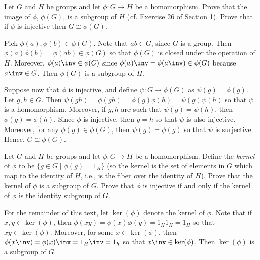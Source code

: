\begin{problems}
\begin{sol}
    \end{sol}
    \item Let $G$ and $H$ be groups and let $\phi : G \to H$ be a homomorphism. Prove that the image of $\phi$, $\phi(G)$, is a subgroup of $H$ (cf. Exercise 26 of Section 1). Prove that if $\phi$ is injective then $G \cong \phi(G)$.
    \begin{sol}
        Pick $\phi(a), \phi(b) \in \phi(G)$. Note that $ab \in G$, since $G$ is a group. Then $\phi(a)\phi(b) = \phi(ab) \in \phi(G)$ so that $\phi(G)$ is closed under the operation of $H$. Moreover, $\phi(a)\inv \in \phi(G)$ since $\phi(a)\inv = \phi(a\inv) \in \phi(G)$ because $a\inv \in G$. Then $\phi(G)$ is a subgroup of $H$. 
        
        Suppose now that $\phi$ is injective, and define $\psi : G \to \phi(G)$ as $\psi(g) = \phi(g)$. Let $g, h \in G$. Then $\psi(gh) = \phi(gh) = \phi(g)\phi(h) = \psi(g)\psi(h)$ so that $\psi$ is a homomorphism. Moreover, if $g, h$ are such that $\psi(g) = \psi(h)$, then $\phi(g) = \phi(h)$. Since $\phi$ is injective, then $g = h$ so that $\psi$ is also injective. Moreover, for any $\phi(g) \in \phi(G)$, then $\psi(g) = \phi(g)$ so that $\psi$ is surjective. Hence, $G \cong \phi(G)$.
    \end{sol}
    \item Let $G$ and $H$ be groups and let $\phi : G \to H$ be a homomorphism. Define the \emph{kernel} of $\phi$ to be $\{ g \in G \mid \phi(g) = 1_H \}$ (so the kernel is the set of elements in $G$ which map to the identity of $H$, i.e., is the fiber over the identity of $H$). Prove that the kernel of $\phi$ is a subgroup of $G$. Prove that $\phi$ is injective if and only if the kernel of $\phi$ is the identity subgroup of $G$.
    \begin{sol}
        For the remainder of this text, let $\ker(\phi)$ denote the kernel of $\phi$. Note that if $x, y \in \ker(\phi)$, then $\phi(xy) = \phi(x)\phi(y) = 1_H1_H = 1_H$ so that $xy \in \ker(\phi)$. Moreover, for some $x \in \ker(\phi)$, then $\phi(x\inv) = \phi(x)\inv = 1_H\inv = 1_h$ so that $x\inv \in \ker(\phi)$. Then $\ker(\phi)$ is a subgroup of $G$.
        

\end{sol}
\end{problems}
